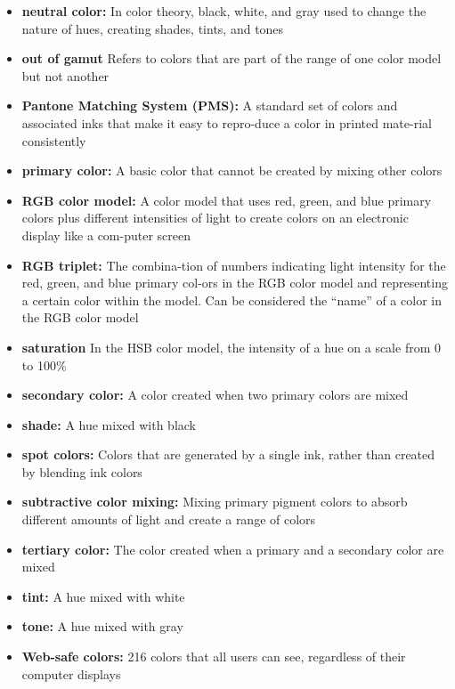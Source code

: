 \documentclass{report}
\begin{document}
\begin{itemize}
        \item \textbf{neutral color:} In color theory, black, white, and gray used to change the nature of hues, creating shades, tints, and tones
        \item \textbf{out of gamut} Refers to colors that are part of the range of one color model but not another
        \item \textbf{Pantone Matching System (PMS):} A standard set of colors and associated inks that make it easy to repro-duce a color in printed mate-rial consistently
        \item \textbf{primary color:} A basic color that cannot be created by mixing other colors
        \item \textbf{RGB color model:} A color model that uses red, green, and blue primary colors plus different intensities of light to create colors on an electronic display like a com-puter screen
        \item \textbf{RGB triplet:} The combina-tion of numbers indicating light intensity for the red, green, and blue primary col-ors in the RGB color model and representing a certain color within the model. Can be considered the “name” of a color in the RGB color model
        \item \textbf{saturation} In the HSB color model, the intensity of a hue on a scale from 0 to 100\%
        \item \textbf{secondary color:} A color created when two primary colors are mixed
        \item \textbf{shade:} A hue mixed with black
        \item \textbf{spot colors:} Colors that are generated by a single ink, rather than created by blending ink colors
        \item \textbf{subtractive color mixing:} Mixing primary pigment colors to absorb different amounts of light and create a range of colors
        \item \textbf{tertiary color:} The color created when a primary and a secondary color are mixed
        \item \textbf{tint:} A hue mixed with white
        \item \textbf{tone:} A hue mixed with gray
        \item \textbf{Web-safe colors:} 216 colors that all users can see, regardless of their computer displays
         \end{itemize}
\end{document}
